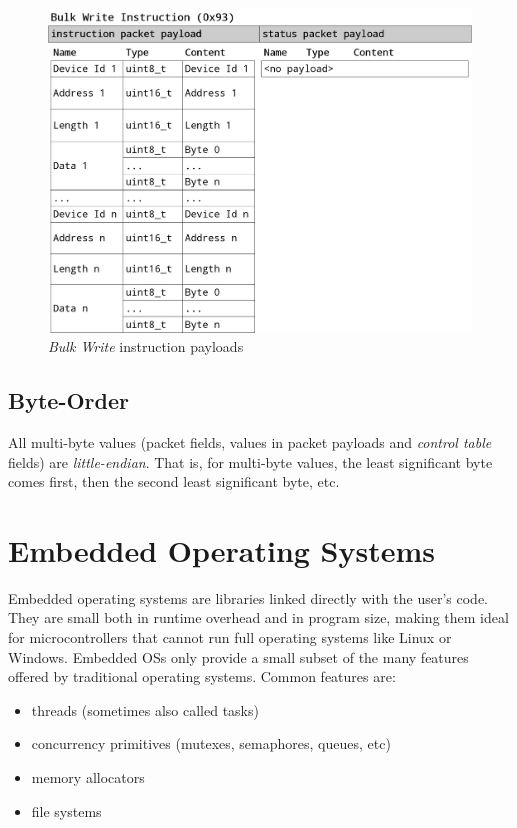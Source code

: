 \begin{figure}[H]
    \centering
    \includegraphics[scale=0.2]{img/bulk_write_packet.png}
    \caption{\textit{Bulk Write} instruction payloads}
\end{figure}

\subsection{Byte-Order}
\label{basics/dynamixel-protocol/byte-order}

All multi-byte values (packet fields, values in packet payloads and \textit{control table} fields) are
\textit{little-endian}. That is, for multi-byte values, the least significant byte comes first, then the
second least significant byte, etc.

\section{Embedded Operating Systems}
\label{basics/embedded-operating-systems}

Embedded operating systems are libraries linked directly with the user's code. They are small
both in runtime overhead and in program size, making them ideal for microcontrollers that cannot run
full operating systems like Linux or Windows. Embedded OSs only provide a small subset of the many
features offered by traditional operating systems. Common features are:

\begin{itemize}
    \item threads (sometimes also called tasks)
    \item concurrency primitives (mutexes, semaphores, queues, etc)
    \item memory allocators
    \item file systems
\end{itemize}

